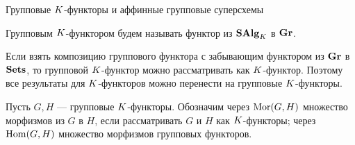\begin{subsection}{Групповые $K$-функторы и аффинные групповые суперсхемы}
  \begin{definition}
    Групповым $K$-функтором будем называть функтор из $ \mathbf{SAlg}_K $ в $ \mathbf{Gr} $.
  \end{definition}
  Если взять композицию группового функтора с забывающим функтором из $ \mathbf{Gr} $ в $ \mathbf{Sets} $,
  то групповой $K$-функтор можно рассматривать как $K$-функтор. Поэтому все результаты
  для $K$-функторов можно перенести на групповые $K$-функторы.

  Пусть $ G, H $ --- групповые $K$-функторы. Обозначим через
  $ \mathrm{Mor}(G, H) $ множество морфизмов из $ G $ в $ H $, если рассматривать $ G $ и $ H $
  как $K$-функторы;
  через $ \mathrm{Hom}(G, H) $ множество морфизмов групповых функторов.

  
\end{subsection}



